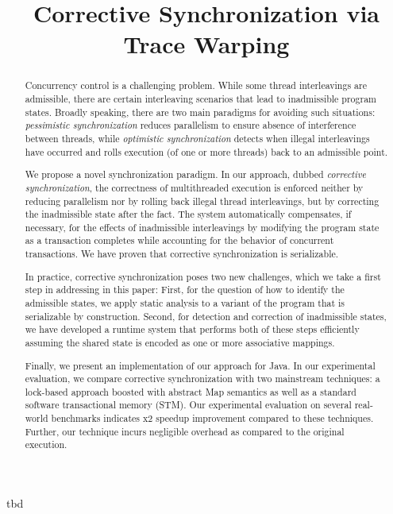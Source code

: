 \documentclass[preprint,nocopyrightspace]{sigplanconf}
\begin{document}
\title{Corrective Synchronization via Trace Warping}
 {tbd}

 {} {} 

\maketitle

\begin{abstract}
	Concurrency control is a challenging problem. While some thread interleavings are admissible, there are certain interleaving scenarios that lead to inadmissible program states. Broadly speaking, there are two main paradigms for avoiding such situations: \emph{pessimistic synchronization} reduces parallelism to ensure absence of interference between threads, while \emph{optimistic synchronization} detects when illegal interleavings have occurred and rolls execution (of one or more threads) back to an admissible point.
	
	We propose a novel synchronization paradigm. In our approach, dubbed \emph{corrective synchronization}, the correctness of multithreaded execution is enforced neither by reducing parallelism nor by rolling back illegal thread interleavings, but by correcting the inadmissible state after the fact. The system automatically compensates, if necessary, for the effects of inadmissible interleavings by modifying the program state as a transaction completes while accounting for the behavior of concurrent transactions. We have proven that corrective synchronization is serializable.
	
	In practice, corrective synchronization poses two new challenges, which we take a first step in addressing in this paper: First, for the question of how to identify the admissible states, we apply static analysis to a variant of the program that is serializable by construction. Second, for detection and correction of inadmissible states, we have developed a runtime system that performs both of these steps efficiently assuming the shared state is encoded as one or more associative mappings.
	
	Finally, we present an implementation of our approach for Java. In our experimental evaluation, we compare corrective synchronization with two mainstream techniques: a lock-based approach boosted with abstract {\sf Map} semantics as well as a standard software transactional memory (STM). Our experimental evaluation on several real-world benchmarks indicates x2 speedup improvement compared to these techniques. Further, our technique incurs negligible overhead as compared to the original execution.
\end{abstract}
\end{document}
